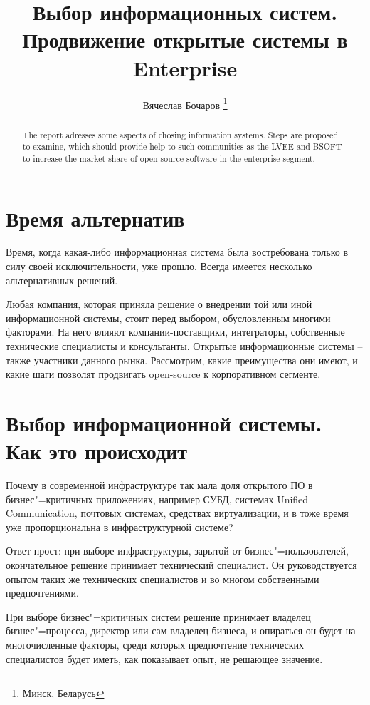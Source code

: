 \documentclass[10pt, a5paper]{article}
\begin{document}
\title{Выбор информационных систем. Продвижение открытые системы в Enterprise}
\author{Вячеслав Бочаров \footnote{Минск, Беларусь}}
\maketitle
\begin{abstract}
The report adresses some aspects of chosing information systems. Steps are proposed to examine, which should provide help to such communities as the LVEE and BSOFT to increase the market share of open source software in the enterprise segment.
\end{abstract}
\section*{Время альтернатив}

Время, когда какая-либо информационная система была востребована только в силу своей исключительности, уже прошло. 
Всегда имеется несколько альтернативных решений.

Любая компания, которая приняла решение о внедрении той или иной информационной системы, стоит перед выбором, обусловленным многими факторами. На него влияют компании-поставщики, интеграторы, собственные технические специалисты и консультанты.
Открытые информационные системы -- также участники данного рынка. Рассмотрим, какие преимущества они имеют, и какие шаги позволят продвигать open-source  к корпоративном сегменте.

\section*{Выбор информационной системы. Как это происходит}

Почему в современной инфраструктуре так мала доля открытого ПО в бизнес"=критичных приложениях, например СУБД, системах Unified Communication, почтовых системах, средствах виртуализации, и в тоже время уже пропорциональна в инфраструктурной системе?

Ответ прост: при выборе инфраструктуры, зарытой от бизнес"=пользователей, окончательное решение принимает технический специалист. Он руководствуется опытом таких же технических специалистов и во многом собственными предпочтениями.

При выборе бизнес"=критичных систем решение принимает владелец бизнес"=процесса, директор или сам владелец бизнеса, и опираться он будет на многочисленные факторы, среди которых предпочтение технических специалистов будет иметь, как показывает опыт, не решающее значение.
\end{document}
